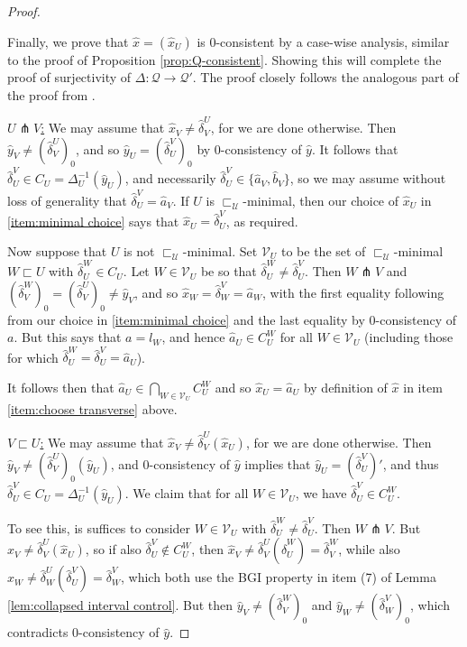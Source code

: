 \documentclass{amsart}
\theoremstyle{definition}
\theoremstyle{remark}
\theoremstyle{definition}
\newcommand{\calQ}{\mathcal{Q}}
\newcommand{\calU}{\mathcal{U}}
\newcommand{\calV}{\mathcal{V}}
\newcommand{\hx}{\hat{x}}
\newcommand{\ha}{\hat{a}}
\newcommand{\hb}{\hat{b}}
\newcommand{\hy}{\hat{y}}
\newcommand{\hd}{\hat{\delta}}
\newcommand{\nest}{\sqsubset}
\begin{document}
\begin{proof}
\begin{enumerate}
\end{enumerate}

Finally, we prove that $\hx = (\hx_U)$ is $0$-consistent by a case-wise analysis, similar to the proof of Proposition \ref{prop:Q-consistent}.  Showing this will complete the proof of surjectivity of $\Delta: \calQ \to \calQ'$.  The proof closely follows the analogous part of the proof from \cite[Theorem 10.2]{Dur_infcube}.

\vspace{.1in}

\underline{$U \pitchfork V$:} We may assume that $\hx_V \neq \hd^U_V$, for we are done otherwise.  Then $\hy_V \neq (\hd^U_V)_0$, and so $\hy_U = (\hd^V_U)_0$ by $0$-consistency of $\hy$.  It follows that $\hd^V_U \in C_U = \Delta^{-1}_U(\hy_U)$, and necessarily $\hd^V_U  \in \{\ha_V, \hb_V\}$, so we may assume without loss of generality that $\hd^V_U = \ha_V$.  If $U$ is $\nest_{\calU}$-minimal, then our choice of $\hx_U$ in \eqref{item:minimal choice} says that $\hx_U = \hd^V_U$, as required.

Now suppose that $U$ is not $\nest_{\calU}$-minimal.  Set $\calV_U$ to be the set of $\nest_{\calU}$-minimal $W \nest U$ with $\hd^W_U \in C_U$.  Let $W \in \calV_U$ be so that $\hd^W_U \neq \hd^V_U$.  Then $W \pitchfork V$ and $(\hd^W_V)_0 = (\hd^U_V)_0 \neq \hy_V$, and so $\hx_W = \hd^V_W = \ha_W$, with the first equality following from our choice in \eqref{item:minimal choice} and the last equality by $0$-consistency of $a$.  But this says that $a = l_W$, and hence $\ha_U \in C^W_U$ for all $W \in \calV_U$ (including those for which $\hd^W_U = \hd^V_U = \ha_U$).

It follows then that $\ha_U \in \bigcap_{W \in \calV_U}C^W_U$ and so $\hx_U = \ha_U$ by definition of $\hx$ in item \eqref{item:choose transverse} above.

\vspace{.1in}

\underline{$V \nest U$:} We may assume that $\hx_V \neq \hd^U_V(\hx_U)$, for we are done otherwise.  Then $\hy_V \neq (\hd^U_V)_0(\hy_U)$, and $0$-consistency of $\hy$ implies that $\hy_U = (\hd^V_U)'$, and thus $\hd^V_U \in C_U = \Delta^{-1}_U(\hy_U)$.  We claim that for all $W \in \calV_U$, we have $\hd^V_U \in C^W_U$.

To see this, is suffices to consider $W \in \calV_U$ with $\hd^W_U \neq \hd^V_U$.  Then $W \pitchfork V$.  But $\hx_V \neq \hd^U_V(\hx_U)$, so if also $\hd^V_U \notin C^W_U$, then $\hx_V \neq \hd^U_V(\hd^W_U) = \hd^W_V$, while also $\hx_W \neq \hd^U_W(\hd^V_U) = \hd^V_W$, which both use the BGI property in item (7) of Lemma \ref{lem:collapsed interval control}.  But then $\hy_V \neq (\hd^W_V)_0$ and $\hy_W \neq (\hd^V_W)_0$, which contradicts $0$-consistency of $\hy$.


\end{proof}
\end{document}
